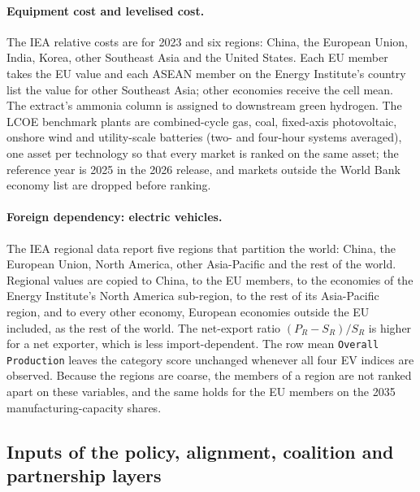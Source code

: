 \paragraph{Equipment cost and levelised cost.} The IEA relative costs are for 2023 and six
regions: China, the European Union, India, Korea, other Southeast Asia and the United States. Each
EU member takes the EU value and each ASEAN member on the Energy Institute's country list the
value for other Southeast Asia; other economies receive the cell mean. The extract's ammonia
column is assigned to downstream green hydrogen. The LCOE benchmark plants are combined-cycle gas,
coal, fixed-axis photovoltaic, onshore wind and utility-scale batteries (two- and four-hour
systems averaged), one asset per technology so that every market is ranked on the same asset;
the reference year is 2025 in the 2026 release, and markets outside the World Bank economy list
are dropped before ranking.

\paragraph{Foreign dependency: electric vehicles.} The IEA regional data report five regions that
partition the world: China, the European Union, North America, other Asia-Pacific and the rest of
the world. Regional values are copied to China, to the EU members, to the economies of the Energy
Institute's North America sub-region, to the rest of its Asia-Pacific region, and to every other
economy, European economies outside the EU included, as the rest of the world. The net-export
ratio $(P_R-S_R)/S_R$ is higher for a net exporter, which is less import-dependent. The row mean
\texttt{Overall Production} leaves the category score unchanged whenever all four EV indices are
observed. Because the regions are coarse, the members of a region are not ranked apart on these
variables, and the same holds for the EU members on the 2035 manufacturing-capacity shares.

\subsection{Inputs of the policy, alignment, coalition and partnership layers}\label{app:other_inputs}

